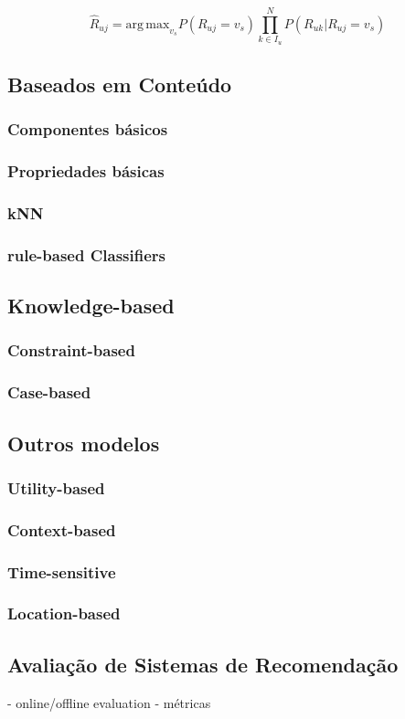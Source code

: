 \begin{equation}
    \hat{R}_{uj} = \mathrm{arg\,max}_{v_s} P(R_{uj} = v_s) \prod_{k \in I_{u}}^{N}P(R_{uk}|R_{uj} = v_s)
\end{equation}
    
\subsection{Baseados em Conteúdo}
\subsubsection{Componentes básicos}
\subsubsection{Propriedades básicas}
\subsubsection{kNN}
\subsubsection{rule-based Classifiers}

\subsection{Knowledge-based}
\subsubsection{Constraint-based}
\subsubsection{Case-based}


\subsection{Outros modelos}
\subsubsection{Utility-based}
\subsubsection{Context-based}
\subsubsection{Time-sensitive}
\subsubsection{Location-based}

\subsection{Avaliação de Sistemas de Recomendação}
- online/offline evaluation
- métricas




